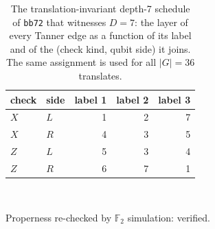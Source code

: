 \begin{table}[tb]
\centering
\small
\caption{The translation-invariant depth-7 schedule of \texttt{bb72} that witnesses $D=7$: the layer of every Tanner edge as a function of its label and of the (check kind, qubit side) it joins.  The same assignment is used for all $|G|=36$ translates.}
\label{tabS:depth7}
\begin{tabular}{llrrr}
\toprule
check & side & label 1 & label 2 & label 3 \\
\midrule
$X$ & $L$ & 1 & 2 & 7 \\
$X$ & $R$ & 4 & 3 & 5 \\
$Z$ & $L$ & 5 & 3 & 4 \\
$Z$ & $R$ & 6 & 7 & 1 \\
\bottomrule
\end{tabular}
\\[2pt]\begin{minipage}{\linewidth}\footnotesize Properness re-checked by $\mathbb{F}_2$ simulation: verified.\end{minipage}
\end{table}
